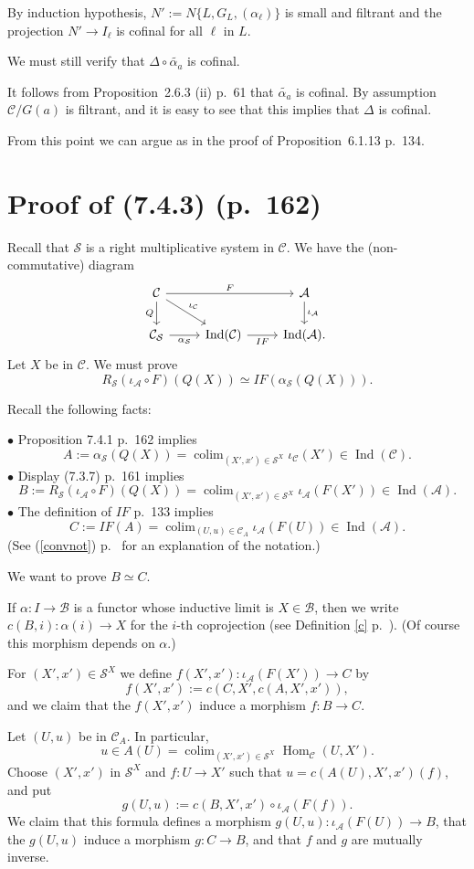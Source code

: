 \documentclass[12pt]{article}
\theoremstyle{remark}
\theoremstyle{definition}
\newcommand{\bu}{\bullet}
\newcommand{\n}{\noindent}
\newcommand{\A}{\mathcal A}
\newcommand{\B}{\mathcal B}
\newcommand{\C}{\mathcal C}
\newcommand{\SSS}{\mathcal S}
\newcommand{\pr}{Proposition}
\newcommand{\cn}{(See (\ref{convnot}) p.~\pageref{convnot} for an explanation of the notation.) }
\DeclareMathOperator*{\coli}{colim}
\DeclareMathOperator*{\co}{colim}
\DeclareMathOperator{\h}{Hom}
\DeclareMathOperator{\Ind}{Ind}
\begin{document}
By induction hypothesis, $N':=N\{L,G_L,(\alpha_\ell)\}$ is small and filtrant and the projection $N'\to I_\ell$ is cofinal for all $\ell$ in $L$. 

We must still verify that $\Delta\circ\widetilde{\alpha_a}$ is cofinal. 

It follows from \pr\ 2.6.3 (ii) p.~61 that $\widetilde{\alpha_a}$ is cofinal. By assumption $\C/G(a)$ is filtrant, and it is easy to see that this implies that $\Delta$ is cofinal. 

From this point we can argue as in the proof of \pr\ 6.1.13 p.~134. 
%
\section{Proof of (7.4.3) (p.~162)} %
%
Recall that $\SSS$ is a right multiplicative system in $\C$. We have the (non-commutative) diagram
$$
\begin{tikzcd}
\C\ar{rr}{F}\ar{d}[swap]{Q}\ar{dr}{\iota_\C}&&\A\ar{d}{\iota_\A}\\ 
\C_\SSS\ar{r}[swap]{\alpha_\SSS}&\Ind(\C)\ar{r}[swap]{IF}&\Ind(\A).
\end{tikzcd}
$$
Let $X$ be in $\C$. We must prove 
$$
R_\SSS(\iota_\A\circ F)(Q(X))\simeq IF(\alpha_\SSS(Q(X))).
$$

Recall the following facts: 

\n$\bu$ Proposition 7.4.1 p.~162 implies
$$
A:=\alpha_\SSS(Q(X))=\coli_{(X',x')\in\SSS^X}\iota_\C(X')\in\Ind(\C).
$$ 
$\bu$ Display (7.3.7) p.~161 implies
$$
B:=R_\SSS(\iota_\A\circ F)(Q(X))=\coli_{(X',x')\in\SSS^X}\iota_\A(F(X'))\in\Ind(\A).
$$
$\bu$ The definition of $IF$ p.~133 implies
$$
C:=IF(A)=\coli_{(U,u)\in\C_A}\iota_\A(F(U))\in\Ind(\A).
$$ 
\cn 

We want to prove $B\simeq C$.  

\n{\em Notation.} If $\alpha:I\to\B$ is a functor whose inductive limit is $X\in\B$, then we write $c(B,i):\alpha(i)\to X$ for the $i$-th coprojection (see Definition \ref{c} p.~\pageref{c}). (Of course this morphism depends on $\alpha$.) 

For $(X',x')\in\SSS^X$ we define $f(X',x'):\iota_\A(F(X'))\to C$ by 
$$
f(X',x'):=c(C,X',c(A,X',x')),
$$ 
and we claim that the $f(X',x')$ induce a morphism $f:B\to C$. 

Let $(U,u)$ be in $\C_A$. In particular, 
$$
u\in A(U)=\co_{(X',x')\in\SSS^X}\h_\C(U,X').
$$ 
Choose $(X',x')$ in $\SSS^X$ and $f:U\to X'$ such that $u=c(A(U),X',x')(f)$, and put  
$$
g(U,u):=c(B,X',x')\circ\iota_\A(F(f)).
$$ 
We claim that this formula defines a morphism $g(U,u):\iota_\A(F(U))\to B$, that the $g(U,u)$ induce a morphism $g:C\to B$, and that $f$ and $g$ are mutually inverse. 
\end{document}
